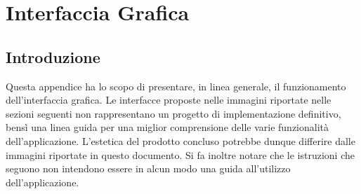 \appendix	

\chapter{Interfaccia Grafica}

\section{Introduzione}

Questa appendice ha lo scopo di presentare, in linea generale, il funzionamento dell'interfaccia grafica. Le interfacce proposte nelle immagini riportate nelle sezioni seguenti non rappresentano un progetto di implementazione definitivo, bensì una linea guida per una miglior comprensione delle varie funzionalità dell'applicazione. L'estetica del prodotto concluso potrebbe dunque differire dalle immagini riportate in questo documento. Si fa inoltre notare che le istruzioni che seguono non intendono essere in alcun modo una guida all'utilizzo dell'applicazione.


